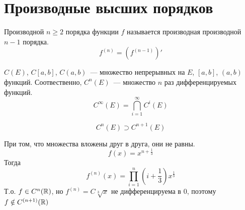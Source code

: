 \section{Производные высших порядков}

\begin{Def}
Производной $n \geqslant 2$ порядка функции $f$ называется производная производной $n - 1$ порядка.
$$f^{(n)} = \left(f^{(n-1)}\right)'$$
\end{Def}

\begin{Def}
$C(E)$, $C[a, b]$, $C(a, b)$~--- множество непрерывных на $E$, $[a, b]$, $(a, b)$ функций. Соотвественно, $C^n(E)$~--- множество $n$ раз дифференцируемых функций.
$$C^\infty(E) = \bigcap_{i=1}^\infty C^i(E)$$
\end{Def}

\begin{assertion}
$$C^n(E) \supset C^{n+1}(E)$$
\end{assertion}
\begin{Rem}
При том, что множества вложены друг в друга, они не равны.
$$f(x) = x^{n + \frac13}$$
Тогда 
$$f^{(n)} (x) = \prod_{i=1}^n \left(i+\frac13\right) x^{\frac13}$$
Т.о. $f \in C^n(\mathbb{R})$, но $f^{(n)} = C \sqrt[3]{x}$ не дифференцируема в $0$, поэтому $f \notin C^{(n+1)}(\mathbb{R})$
\end{Rem}